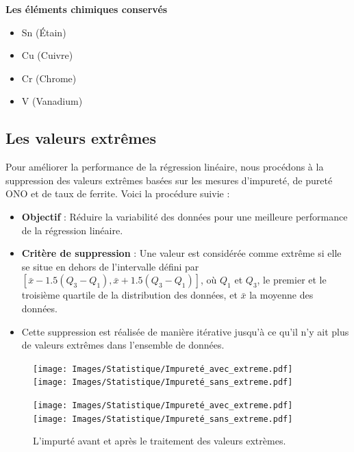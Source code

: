 \documentclass[12pt]{article}
\begin{document}
\textbf{Les éléments chimiques conservés}
\begin{itemize}
\item Sn (Étain) 
\item Cu (Cuivre)
\item Cr (Chrome) 
\item V (Vanadium)
\end{itemize}






\subsection{Les valeurs extrêmes}



Pour améliorer la performance de la régression linéaire, nous procédons à la suppression des valeurs extrêmes basées sur les mesures d'impureté, de pureté ONO et de taux de ferrite. Voici la procédure suivie :

\begin{itemize}
    \item \textbf{Objectif} : Réduire la variabilité des données pour une meilleure performance de la régression linéaire.
    \item \textbf{Critère de suppression } : Une valeur est considérée comme extrême si elle se situe en dehors de l'intervalle défini par $[\bar{x} - 1.5(Q_3 - Q_1), \bar{x} + 1.5(Q_3 - Q_1)]$, où $Q_1$ et $Q_3$, le premier et le troisième quartile de la distribution des données, et $\bar{x}$ la moyenne des données.
    \item Cette suppression est réalisée de manière itérative jusqu'à ce qu'il n'y ait plus de valeurs extrêmes dans l'ensemble de données.
\end{itemize}





\begin{figure}[H]
    \texttt{[image: Images/Statistique/Impureté\_avec\_extreme.pdf]}
    \texttt{[image: Images/Statistique/Impureté\_sans\_extreme.pdf]}
\end{figure}


\begin{figure}[H]
    \centering
    \begin{adjustbox}{width=1.3\textwidth,center}
        \texttt{[image: Images/Statistique/Impureté\_avec\_extreme.pdf]}
        \texttt{[image: Images/Statistique/Impureté\_sans\_extreme.pdf]}
    \end{adjustbox}
    \caption{L'impurté avant et après le traitement des valeurs extrèmes.}
    \label{fig:Extrem}
\end{figure}
\end{document}
